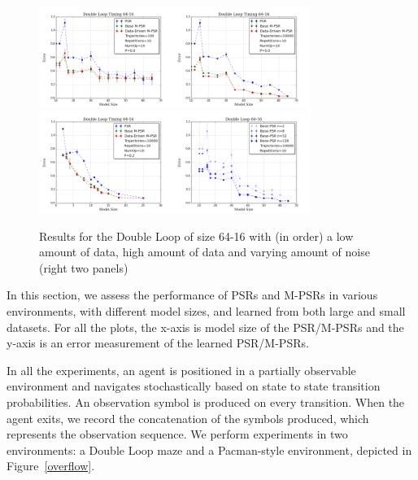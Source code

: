 \documentclass[letterpaper]{article}
\begin{document}
\begin{figure}[ht!]
\centering
\includegraphics[width=44mm]{64-16-100.png}\includegraphics[width=44mm]{64-16-10000.png}\includegraphics[width=44mm]{NoiseInfo.png}\includegraphics[width=44mm]{basePows.png}%
\vspace*{-4mm}
\caption{Results for the Double Loop of size 64-16 with (in order) a low amount of data, high amount of data and varying amount of noise (right two panels)\label{fig-double}\vspace*{-4mm}}
\end{figure}

In this section, we assess the performance of PSRs and M-PSRs in various environments, with different model sizes, and learned from both large and small datasets. For all the plots, the x-axis is model size of the PSR/M-PSRs and the y-axis is an error measurement of the learned PSR/M-PSRs.

In all the experiments, an agent is positioned in  a partially observable environment and navigates  stochastically based on state to state transition probabilities. An observation symbol is produced on every transition. When the agent exits, we record the concatenation of the symbols produced, which represents the observation sequence.  We perform experiments in two environments: a Double Loop maze and a Pacman-style environment, depicted in Figure~\ref{overflow}.
\end{document}
